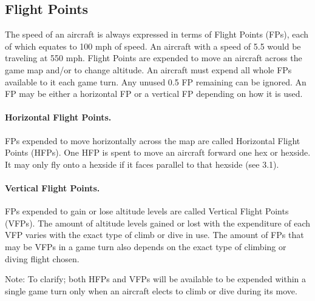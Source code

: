 \subsection{Flight Points}

The speed of an aircraft is always expressed in terms of Flight Points (FPs), each of which equates to 100 mph of speed. An aircraft with a speed of 5.5 would be traveling at 550 mph. Flight Points are expended to move an aircraft across the game map and/or to change altitude.  An aircraft must expend all whole FPs available to it each game turn. Any unused 0.5 FP remaining can be ignored. An FP may be either a horizontal FP or a vertical FP depending on how it is used.

\paragraph{Horizontal Flight Points.} FPs expended to move horizontally across the map are called Horizontal Flight Points (HFPs). One HFP is spent to move an aircraft forward one hex or hexside. It may only fly onto a hexside if it faces parallel to that hexside (see 3.1).

\paragraph{Vertical Flight Points.} FPs expended to gain or lose altitude levels are called Vertical Flight Points (VFPs). The amount of altitude levels gained or lost with the expenditure of each VFP varies with the exact type of climb or dive in use.  The amount of FPs that may be VFPs in a game turn also depends on the exact type of climbing or diving flight chosen.

Note: To clarify; both HFPs and VFPs will be available to be expended within a single game turn only when an aircraft elects to climb or dive during its move.



